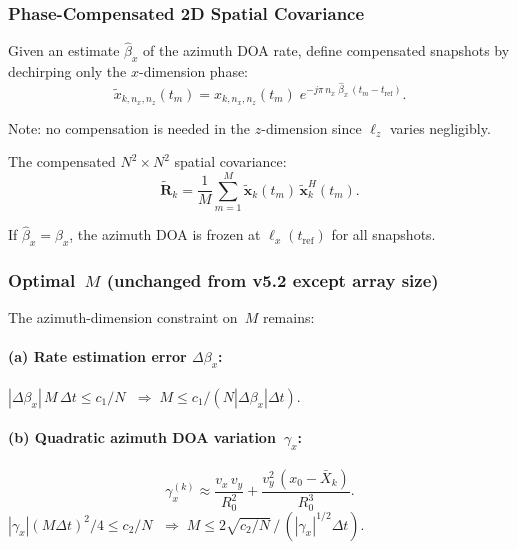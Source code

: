 \documentclass[11pt,a4paper]{article}
\begin{document}
\subsubsection{Phase-Compensated 2D Spatial Covariance}
\label{sec:phase_comp}

Given an estimate $\hat{\beta}_x$ of the azimuth DOA rate, define
compensated snapshots by dechirping only the $x$-dimension phase:
\begin{equation}
  \boxed{
  \tilde{x}_{k,n_x,n_z}(t_m) = x_{k,n_x,n_z}(t_m)\;
  e^{-j\pi\,n_x\;\!\hat{\beta}_x\,(t_m - t_{\mathrm{ref}})}.}
  \label{eq:phase_comp}
\end{equation}

Note: no compensation is needed in the $z$-dimension since
$\ell_z$ varies negligibly.

The compensated $N^2\times N^2$ spatial covariance:
\begin{equation}
  \tilde{\mathbf{R}}_k
  = \frac{1}{M}\sum_{m=1}^{M}
  \tilde{\mathbf{x}}_k(t_m)\,\tilde{\mathbf{x}}_k^H(t_m).
  \label{eq:cov_compensated}
\end{equation}

If $\hat{\beta}_x=\beta_x$, the azimuth DOA is frozen at
$\ell_x(t_{\mathrm{ref}})$ for all snapshots.

\subsubsection{Optimal~$M$ (unchanged from v5.2 except array size)}
\label{sec:optimal_M}

The azimuth-dimension constraint on~$M$ remains:

\paragraph{(a) Rate estimation error $\Delta\beta_x$:}
$|\Delta\beta_x|\,M\,\Delta t \le c_1/N$
$\;\Longrightarrow\;M \le c_1/(N|\Delta\beta_x|\Delta t)$.

\paragraph{(b) Quadratic azimuth DOA variation~$\gamma_x$:}
\begin{equation}
  \gamma_x^{(k)} \approx \frac{v_x\,v_y}{R_0^2}
  + \frac{v_y^2\,(x_0{-}\bar{X}_k)}{R_0^3}.
  \label{eq:gamma_x}
\end{equation}
$|\gamma_x|(M\Delta t)^2/4 \le c_2/N$
$\;\Longrightarrow\;M \le 2\sqrt{c_2/N}\,/\,(|\gamma_x|^{1/2}\Delta t)$.
\end{document}
